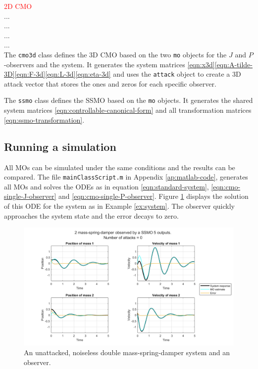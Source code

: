 \textcolor{red}{2D CMO}\\
...\\
...\\
...\\
...\\

The \texttt{cmo3d} class defines the 3D CMO based on the two \texttt{mo} objects for the $J$ and $P$-observers and the system. It generates the system matrices \eqref{eqn:x3d}\eqref{eqn:A-tilde-3D}\eqref{eqn:F-3d}\eqref{eqn:L-3d}\eqref{eqn:eta-3d} and uses the \texttt{attack} object to create a 3D attack vector that stores the ones and zeros for each specific observer.

The \texttt{ssmo} class defines the SSMO based on the \texttt{mo} objects. It generates the shared system matrices \eqref{eqn:controllable-canonical-form} and all transformation matrices \eqref{eqn:ssmo-transformation}. 

\subsection{Running a simulation}
All MOs can be simulated under the same conditions and the results can be compared. The file \texttt{mainClassScript.m} in Appendix \ref{ap:matlab-code}, generates all MOs and solves the ODEs as in equation \eqref{eqn:standard-system}, \eqref{eqn:cmo-single-J-observer} and \eqref{eqn:cmo-single-P-observer}. Figure \ref{fig:unattacked-system-plot} displays the solution of this ODE for the system as in Example \ref{ex:system}. The observer quickly approaches the system state and the error decays to zero.

\newpage
\begin{figure}[ht]
    \centering
    \includegraphics[width=\linewidth]{report/Figures/symplot_5o0a.png}
    \caption{An unattacked, noiseless double mass-spring-damper system and an observer.}
    \label{fig:unattacked-system-plot}
\end{figure}

